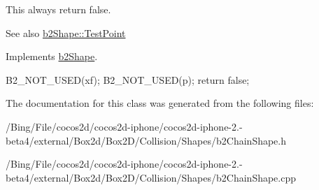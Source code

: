 This always return false. \begin{DoxySeeAlso}{See also}
\hyperlink{classb2_shape_a6ac968e403e2d93e8ae46d728a2e50fa}{b2\-Shape\-::\-Test\-Point} 
\end{DoxySeeAlso}


Implements \hyperlink{classb2_shape_a6ac968e403e2d93e8ae46d728a2e50fa}{b2\-Shape}.


\begin{DoxyCode}
{
        B2_NOT_USED(xf);
        B2_NOT_USED(p);
        return false;
}
\end{DoxyCode}


The documentation for this class was generated from the following files\-:\begin{DoxyCompactItemize}
\item 
/\-Bing/\-File/cocos2d/cocos2d-\/iphone/cocos2d-\/iphone-\/2.-\/beta4/external/\-Box2d/\-Box2\-D/\-Collision/\-Shapes/b2\-Chain\-Shape.\-h\item 
/\-Bing/\-File/cocos2d/cocos2d-\/iphone/cocos2d-\/iphone-\/2.-\/beta4/external/\-Box2d/\-Box2\-D/\-Collision/\-Shapes/b2\-Chain\-Shape.\-cpp\end{DoxyCompactItemize}

